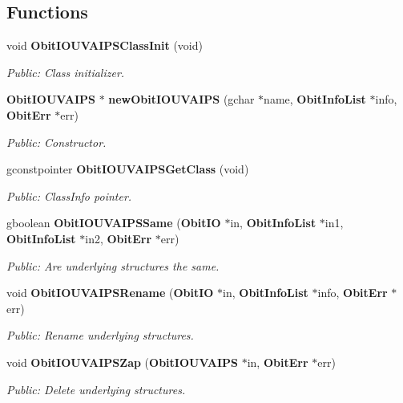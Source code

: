 \subsection*{Functions}
\begin{CompactItemize}
\item 
void {\bf Obit\-IOUVAIPSClass\-Init} (void)
\begin{CompactList}\small\item\em Public: Class initializer. \item\end{CompactList}\item 
{\bf Obit\-IOUVAIPS} $\ast$ {\bf new\-Obit\-IOUVAIPS} (gchar $\ast$name, {\bf Obit\-Info\-List} $\ast$info, {\bf Obit\-Err} $\ast$err)
\begin{CompactList}\small\item\em Public: Constructor. \item\end{CompactList}\item 
gconstpointer {\bf Obit\-IOUVAIPSGet\-Class} (void)
\begin{CompactList}\small\item\em Public: Class\-Info pointer. \item\end{CompactList}\item 
gboolean {\bf Obit\-IOUVAIPSSame} ({\bf Obit\-IO} $\ast$in, {\bf Obit\-Info\-List} $\ast$in1, {\bf Obit\-Info\-List} $\ast$in2, {\bf Obit\-Err} $\ast$err)
\begin{CompactList}\small\item\em Public: Are underlying structures the same. \item\end{CompactList}\item 
void {\bf Obit\-IOUVAIPSRename} ({\bf Obit\-IO} $\ast$in, {\bf Obit\-Info\-List} $\ast$info, {\bf Obit\-Err} $\ast$err)
\begin{CompactList}\small\item\em Public: Rename underlying structures. \item\end{CompactList}\item 
void {\bf Obit\-IOUVAIPSZap} ({\bf Obit\-IOUVAIPS} $\ast$in, {\bf Obit\-Err} $\ast$err)
\begin{CompactList}\small\item\em Public: Delete underlying structures. \item\end{CompactList}\item 

\end{CompactItemize}
